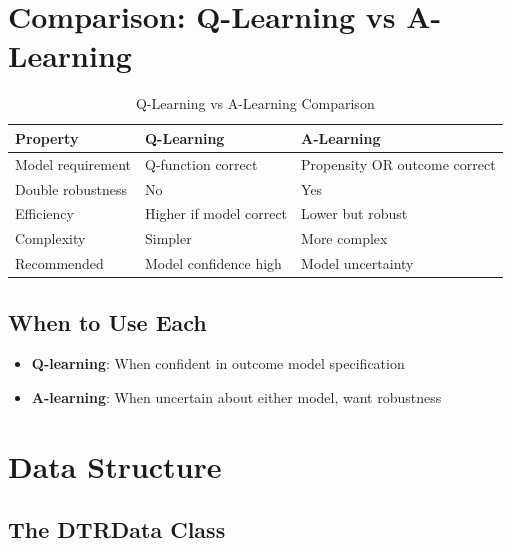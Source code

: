 \section{Comparison: Q-Learning vs A-Learning}

\begin{table}[h]
\centering
\caption{Q-Learning vs A-Learning Comparison}
\begin{tabular}{lll}
\toprule
Property & Q-Learning & A-Learning \\
\midrule
Model requirement & Q-function correct & Propensity OR outcome correct \\
Double robustness & No & Yes \\
Efficiency & Higher if model correct & Lower but robust \\
Complexity & Simpler & More complex \\
Recommended & Model confidence high & Model uncertainty \\
\bottomrule
\end{tabular}
\end{table}

\subsection{When to Use Each}

\begin{itemize}
\item \textbf{Q-learning}: When confident in outcome model specification
\item \textbf{A-learning}: When uncertain about either model, want robustness
\end{itemize}


\section{Data Structure}

\subsection{The DTRData Class}

